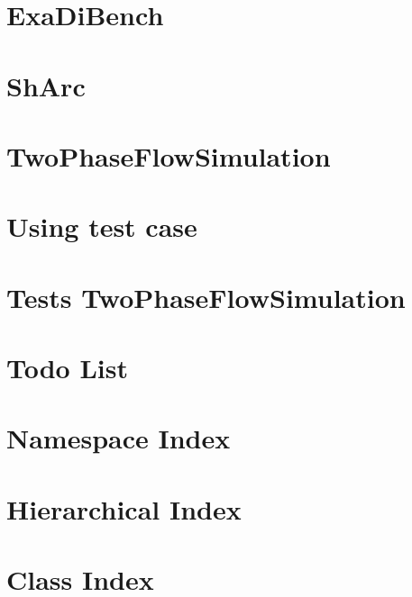 \let\mypdfximage\pdfximage\def\pdfximage{\immediate\mypdfximage}\documentclass[twoside]{book}
\newcommand{\+}{\discretionary{\mbox{\scriptsize$\hookleftarrow$}}{}{}}
\begin{document}
\chapter{Exa\+Di\+Bench}
\label{md__tmp_opencode_sharc_src_ExaDiBench_README}

\chapter{Sh\+Arc}
\label{md__tmp_opencode_sharc_src_ShArc_README}

\chapter{Two\+Phase\+Flow\+Simulation}
\label{md__tmp_opencode_sharc_src_TwoPhaseFlowSimulation_README}

\chapter{Using test case}
\label{md__tmp_opencode_sharc_test_LargeScaleTwoPhaseFlowSimulation_README}

\chapter{Tests Two\+Phase\+Flow\+Simulation}
\label{md__tmp_opencode_sharc_test_TwoPhaseFlowSimulation_README}

\chapter{Todo List}
\label{todo}

\chapter{Namespace Index}

\chapter{Hierarchical Index}

\chapter{Class Index}

\end{document}
